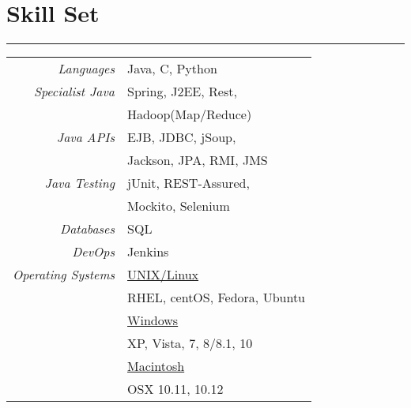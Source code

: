 \section*{\Large \bf \color{Maroon} Skill Set}
\hrule \smallskip
\begin{tabular}{r l}
\textit{Languages} & Java, C, Python \smallskip\\
\textit{Specialist Java} & Spring, J2EE, Rest,  \\
& Hadoop(Map/Reduce) \smallskip\\
\textit{Java APIs} & EJB, JDBC, jSoup, \\
 & Jackson, JPA, RMI, JMS \smallskip\\
\textit{Java Testing} & jUnit, REST-Assured,\\
& Mockito, Selenium \smallskip\\
\textit{Databases} & SQL \smallskip\\
\textit{DevOps} & Jenkins \smallskip\\
\textit{Operating Systems} & \underline{UNIX/Linux} \\
 & RHEL, centOS, Fedora, Ubuntu \\
 & \underline{Windows} \\
 & XP, Vista, 7, 8/8.1, 10 \\
  & \underline{Macintosh} \\
 & OSX 10.11, 10.12 \\
\end{tabular}

